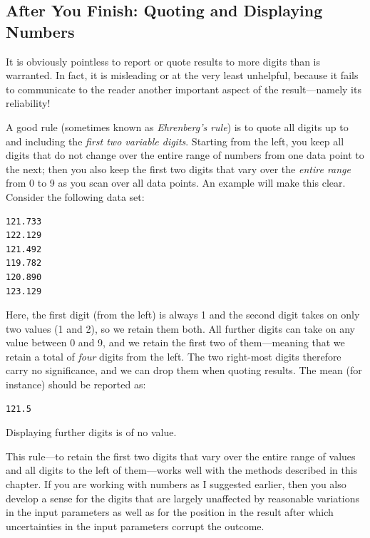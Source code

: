 \subsection{After You Finish: Quoting and Displaying Numbers}
    
It is obviously pointless to report or quote results to more digits
than is warranted.  In fact, it is misleading or at the very least
unhelpful, because it fails to communicate to the reader another
important aspect of the result---namely its reliability!
    
A good rule (sometimes known as \emph{Ehrenberg's rule})  is to quote
all digits up to and including the \emph{first two variable digits}.
Starting from the left, you keep all digits that do not change over
the entire range of numbers from one data point to the next; then you
also keep the first two digits that vary over the \emph{entire range}
from 0 to 9 as you scan over all data points. An example will make
this clear. Consider the following data set:

\begin{verbatim}
121.733
122.129
121.492
119.782
120.890
123.129
\end{verbatim}
    
Here, the first digit (from the left) is always 1 and the second digit
takes on only two values (1 and 2), so we retain them both.  All
further digits can take on any value between 0 and 9, and we retain
the first two of them---meaning that we retain a total of \emph{four}
digits from the left.  The two right-most digits therefore carry no
significance, and we can drop them when quoting results. The mean (for
instance) should be reported as:

\begin{verbatim}
121.5
\end{verbatim}
    
Displaying further digits is of no value.
    
This rule---to retain the first two digits that vary over the entire
range of values and all digits to the left of them---works well with
the methods described in this chapter. If you are working with numbers
as I suggested earlier, then you also develop a sense for the digits
that are largely unaffected by reasonable variations in the input
parameters as well as for the position in the result after which
uncertainties in the input parameters corrupt the outcome.
    
